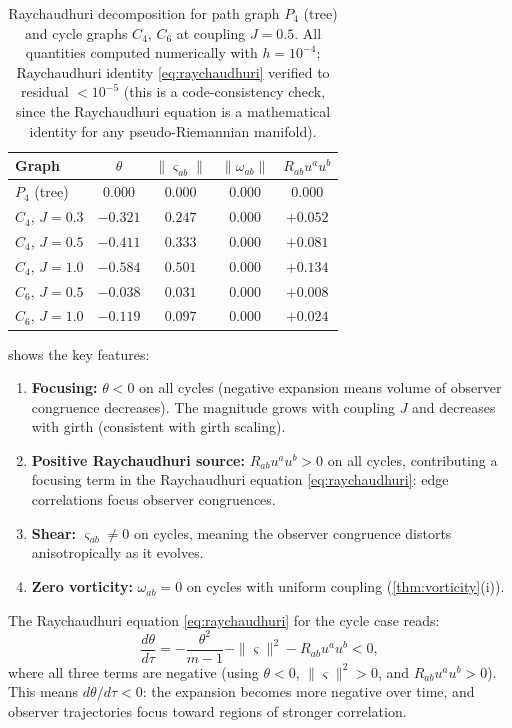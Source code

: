 \documentclass[11pt]{article}
\theoremstyle{definition}
\theoremstyle{remark}
\newcommand{\obs}{u}
\newcommand{\vort}{\omega}
\newcommand{\Ric}{R}
\newcommand{\expan}{\theta}
\newcommand{\shear}{\varsigma} %
\begin{document}
\begin{table}[ht]
\centering
\caption{Raychaudhuri decomposition for path graph $P_4$ (tree) and
cycle graphs $C_4$, $C_6$ at coupling $J = 0.5$. All quantities
computed numerically with $h = 10^{-4}$; Raychaudhuri identity
\eqref{eq:raychaudhuri} verified to residual $< 10^{-5}$ (this
is a code-consistency check, since the Raychaudhuri equation is a
mathematical identity for any pseudo-Riemannian manifold).}
\label{tab:raychaudhuri}
\renewcommand{\arraystretch}{1.3}
\begin{tabular}{lcccc}
\toprule
Graph & $\expan$ & $\|\shear_{ab}\|$ & $\|\vort_{ab}\|$ & $\Ric_{ab}\obs^a\obs^b$ \\
\midrule
$P_4$ (tree) & $0.000$ & $0.000$ & $0.000$ & $0.000$ \\
$C_4$, $J = 0.3$ & $-0.321$ & $0.247$ & $0.000$ & $+0.052$ \\
$C_4$, $J = 0.5$ & $-0.411$ & $0.333$ & $0.000$ & $+0.081$ \\
$C_4$, $J = 1.0$ & $-0.584$ & $0.501$ & $0.000$ & $+0.134$ \\
$C_6$, $J = 0.5$ & $-0.038$ & $0.031$ & $0.000$ & $+0.008$ \\
$C_6$, $J = 1.0$ & $-0.119$ & $0.097$ & $0.000$ & $+0.024$ \\
\bottomrule
\end{tabular}
\end{table}

 shows the key features:
\begin{enumerate}
\item \textbf{Focusing:} $\expan < 0$ on all cycles (negative expansion
  means volume of observer congruence decreases). The magnitude grows
  with coupling $J$ and decreases with girth (consistent with girth scaling).
\item \textbf{Positive Raychaudhuri source:} $\Ric_{ab}\obs^a\obs^b > 0$
  on all cycles, contributing a focusing term in
  the Raychaudhuri equation \eqref{eq:raychaudhuri}: edge correlations
  focus observer congruences.
\item \textbf{Shear:} $\shear_{ab} \neq 0$ on cycles, meaning the
  observer congruence distorts anisotropically as it evolves.
\item \textbf{Zero vorticity:} $\vort_{ab} = 0$ on cycles with
  uniform coupling (\cref{thm:vorticity}(i)).
\end{enumerate}

The Raychaudhuri equation \eqref{eq:raychaudhuri} for the cycle case reads:
\begin{equation}
  \frac{d\expan}{d\tau}
  = -\frac{\expan^2}{m-1} - \|\shear\|^2 - \Ric_{ab}\obs^a\obs^b < 0,
  \label{eq:raychaudhuri-cycle}
\end{equation}
where all three terms are negative (using $\expan < 0$, $\|\shear\|^2 > 0$,
and $\Ric_{ab}\obs^a\obs^b > 0$). This means $d\expan/d\tau < 0$:
the expansion becomes more negative over time, and observer trajectories
focus toward regions of stronger correlation.
\end{document}
